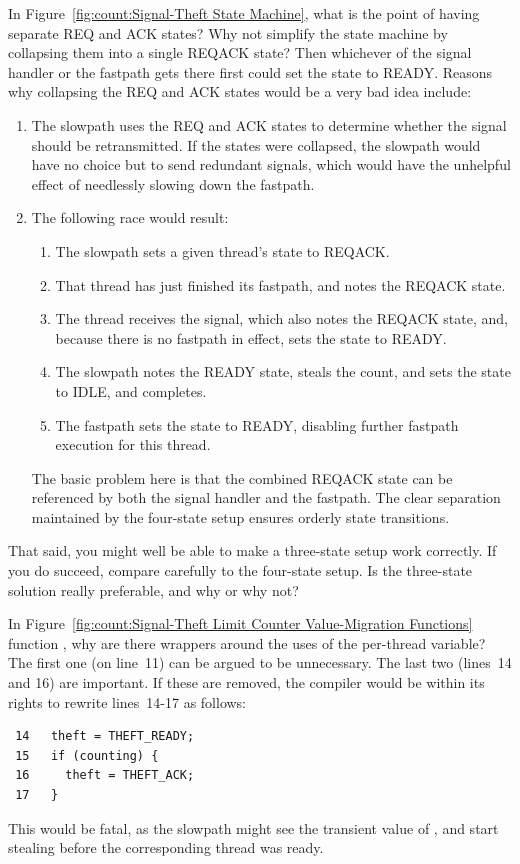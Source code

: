 \QuickQ{}
	In Figure~\ref{fig:count:Signal-Theft State Machine}, what is
	the point of having separate REQ and ACK  states?
	Why not simplify the state machine by collapsing
	them into a single REQACK state?
	Then whichever of the signal handler or the fastpath gets there
	first could set the state to READY.
\QuickA{}
	Reasons why collapsing the REQ and ACK states would be a very
	bad idea include:
	\begin{enumerate}
	\item	The slowpath uses the REQ and ACK states to determine
		whether the signal should be retransmitted.
		If the states were collapsed, the slowpath would have
		no choice but to send redundant signals, which would
		have the unhelpful effect of needlessly slowing down
		the fastpath.
	\item	The following race would result:
		\begin{enumerate}
		\item	The slowpath sets a given thread's state to REQACK.
		\item	That thread has just finished its fastpath, and
			notes the REQACK state.
		\item	The thread receives the signal, which also notes
			the REQACK state, and, because there is no fastpath
			in effect, sets the state to READY.
		\item	The slowpath notes the READY state, steals the
			count, and sets the state to IDLE, and completes.
		\item	The fastpath sets the state to READY, disabling
			further fastpath execution for this thread.
		\end{enumerate}
		The basic problem here is that the combined REQACK state
		can be referenced by both the signal handler and the
		fastpath.
		The clear separation maintained by the four-state
		setup ensures orderly state transitions.
	\end{enumerate}
	That said, you might well be able to make a three-state setup
	work correctly.
	If you do succeed, compare carefully to the four-state setup.
	Is the three-state solution really preferable, and why or why not?

\QuickQ{}
	In Figure~\ref{fig:count:Signal-Theft Limit Counter Value-Migration Functions}
	function , why are there
	 wrappers around the uses of the
	 per-thread variable?
\QuickA{}
	The first one (on line~11) can be argued to be unnecessary.
	The last two (lines~14 and 16) are important.
	If these are removed, the compiler would be within its rights
	to rewrite lines~14-17 as follows:
	\vspace{5pt}
	\begin{minipage}[t]{\columnwidth}
	\small
	\begin{verbatim}
 14   theft = THEFT_READY;
 15   if (counting) {
 16     theft = THEFT_ACK;
 17   }
	\end{verbatim}
	\end{minipage}
	\vspace{5pt}
	This would be fatal, as the slowpath might see the transient
	value of , and start stealing before the
	corresponding thread was ready.

